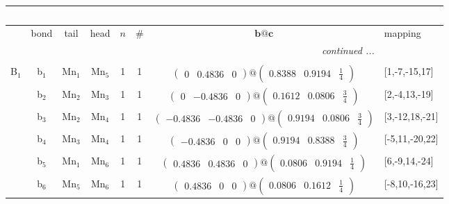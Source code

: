 \documentclass[fleqn,10pt,landscape]{article}
\begin{document}
\begin{itemize}
\begin{center}
\begin{longtable}{cc|cc|c|c|c|l}
\multicolumn{7}{l}{\tablename\ \thetable{}} \\
 \hline \hline
 & bond & tail & head & $n$ & \# & $\bm{b}@\bm{c}$ & mapping \\ \hline \endhead

 \hline \hline
\multicolumn{7}{r}{\footnotesize\it continued ...} \\ \endfoot

 \hline \hline
\multicolumn{7}{r}{} \\ \endlastfoot

B$_{1}$ & b$_{1}$ & Mn$_{1}$ & Mn$_{5}$ & 1 & 1 & $\begin{pmatrix} 0 & 0.4836 & 0 \end{pmatrix}@\begin{pmatrix} 0.8388 & 0.9194 & \frac{1}{4} \end{pmatrix}$ & [1,-7,-15,17] \\
& b$_{2}$ & Mn$_{2}$ & Mn$_{3}$ & 1 & 1 & $\begin{pmatrix} 0 & -0.4836 & 0 \end{pmatrix}@\begin{pmatrix} 0.1612 & 0.0806 & \frac{3}{4} \end{pmatrix}$ & [2,-4,13,-19] \\
& b$_{3}$ & Mn$_{2}$ & Mn$_{4}$ & 1 & 1 & $\begin{pmatrix} -0.4836 & -0.4836 & 0 \end{pmatrix}@\begin{pmatrix} 0.9194 & 0.0806 & \frac{3}{4} \end{pmatrix}$ & [3,-12,18,-21] \\
& b$_{4}$ & Mn$_{3}$ & Mn$_{4}$ & 1 & 1 & $\begin{pmatrix} -0.4836 & 0 & 0 \end{pmatrix}@\begin{pmatrix} 0.9194 & 0.8388 & \frac{3}{4} \end{pmatrix}$ & [-5,11,-20,22] \\
& b$_{5}$ & Mn$_{1}$ & Mn$_{6}$ & 1 & 1 & $\begin{pmatrix} 0.4836 & 0.4836 & 0 \end{pmatrix}@\begin{pmatrix} 0.0806 & 0.9194 & \frac{1}{4} \end{pmatrix}$ & [6,-9,14,-24] \\
& b$_{6}$ & Mn$_{5}$ & Mn$_{6}$ & 1 & 1 & $\begin{pmatrix} 0.4836 & 0 & 0 \end{pmatrix}@\begin{pmatrix} 0.0806 & 0.1612 & \frac{1}{4} \end{pmatrix}$ & [-8,10,-16,23] \\ \hline

\end{longtable}
\end{center}
\end{itemize}
\end{document}
